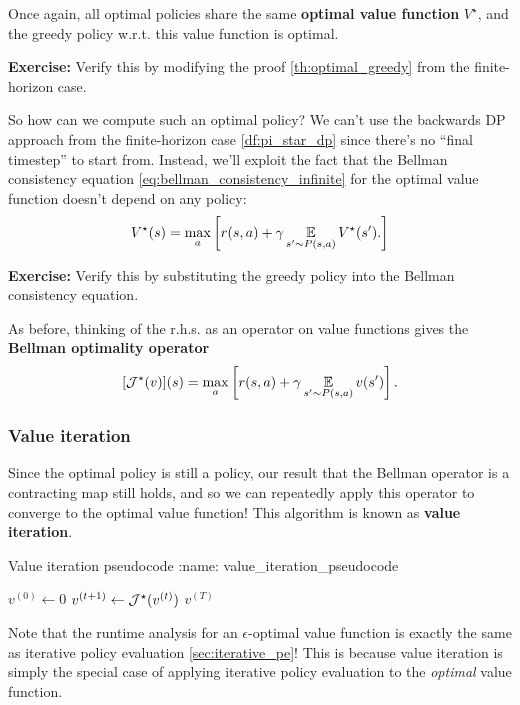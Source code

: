 \documentclass[\main/main]{subfiles}
\begin{document}
Once again, all optimal policies share the same \textbf{optimal value function} $V^\star$, and the greedy policy w.r.t. this value function is optimal.

\textbf{Exercise:} Verify this by modifying the proof \ref{th:optimal_greedy} from the finite-horizon case.

So how can we compute such an optimal policy? We can't use the backwards DP approach from the finite-horizon case \eqref{df:pi_star_dp} since there's no ``final timestep'' to start from. Instead, we'll exploit the fact that the Bellman consistency equation \eqref{eq:bellman_consistency_infinite} for the optimal value function doesn't depend on any policy:
\[
    V^\star(s) = \max_a \left[ r(s, a) + \gamma \operatorname*{\mathbb{E}}_{s' \sim P(s, a)} V^\star(s'). \right]
\]

\textbf{Exercise:} Verify this by substituting the greedy policy into the Bellman consistency equation.

As before, thinking of the r.h.s. as an operator on value functions gives the \textbf{Bellman optimality operator}
\[
    [\mathcal{J}^{\star}(v)](s) = \max_a \left[ r(s, a) + \gamma \operatorname*{\mathbb{E}}_{s' \sim P(s, a)} v(s') \right].
\]

\subsubsection{Value iteration}

Since the optimal policy is still a policy, our result that the Bellman operator is a contracting map still holds, and so we can repeatedly apply this operator to converge to the optimal value function! This algorithm is known as \textbf{value iteration}.

\begin{definition}{Value iteration pseudocode}
:name: value_iteration_pseudocode

    \begin{algorithmic}
        \State $v^{(0)} \gets 0$
            \State $v^{(t+1)} \gets \mathcal{J}^{\star}(v^{(t)})$
        \EndFor
        \State \Return $v^{(T)}$
    \end{algorithmic}
\end{definition}

Note that the runtime analysis for an $\epsilon$-optimal value function is exactly the same as iterative policy evaluation \eqref{sec:iterative_pe}! This is because value iteration is simply the special case of applying iterative policy evaluation to the \emph{optimal} value function.
\end{document}
